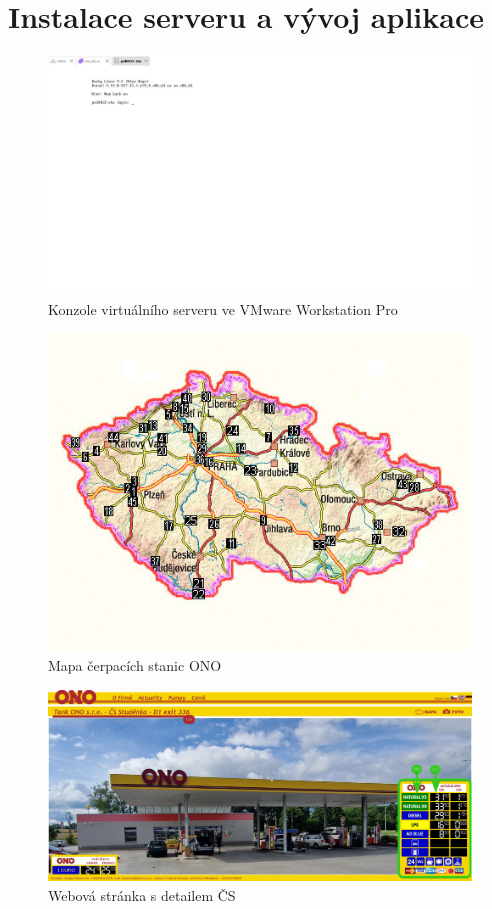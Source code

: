 \chapter{Instalace serveru a vývoj aplikace}

\begin{figure}
    \centering
    \includegraphics[width=\textwidth]{Figures/vmware_console.jpg}
    \caption{Konzole virtuálního serveru ve VMware Workstation Pro}
    \label{fig:vmware-workstation-pro}
\end{figure}

\newpage



\begin{figure}
    \centering
    \includegraphics[width=\textwidth]{Figures/map_pump.jpg}
    \caption{Mapa čerpacích stanic ONO}
    \label{fig:tank-ono-mapa}
\end{figure}

\begin{figure}
    \centering
    \includegraphics[width=\textwidth]{Figures/tank-ono-cs.jpg}
    \caption{Webová stránka s detailem ČS}
    \label{fig:tank-ono-stranka}
\end{figure}